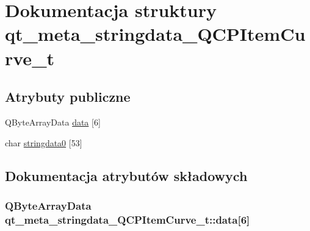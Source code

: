 \hypertarget{structqt__meta__stringdata___q_c_p_item_curve__t}{}\section{Dokumentacja struktury qt\+\_\+meta\+\_\+stringdata\+\_\+\+Q\+C\+P\+Item\+Curve\+\_\+t}
\label{structqt__meta__stringdata___q_c_p_item_curve__t}
\subsection*{Atrybuty publiczne}
\begin{DoxyCompactItemize}
\item 
Q\+Byte\+Array\+Data \hyperlink{structqt__meta__stringdata___q_c_p_item_curve__t_ac6d43f09ee6cd9ad95da06d7fd942e8f}{data} \mbox{[}6\mbox{]}
\item 
char \hyperlink{structqt__meta__stringdata___q_c_p_item_curve__t_a52ddb589fe5c4e7eba75b1eb50799729}{stringdata0} \mbox{[}53\mbox{]}
\end{DoxyCompactItemize}


\subsection{Dokumentacja atrybutów składowych}
\subsubsection[{\texorpdfstring{data}{data}}]{\setlength{\rightskip}{0pt plus 5cm}Q\+Byte\+Array\+Data qt\+\_\+meta\+\_\+stringdata\+\_\+\+Q\+C\+P\+Item\+Curve\+\_\+t\+::data\mbox{[}6\mbox{]}}\hypertarget{structqt__meta__stringdata___q_c_p_item_curve__t_ac6d43f09ee6cd9ad95da06d7fd942e8f}{}\label{structqt__meta__stringdata___q_c_p_item_curve__t_ac6d43f09ee6cd9ad95da06d7fd942e8f}
